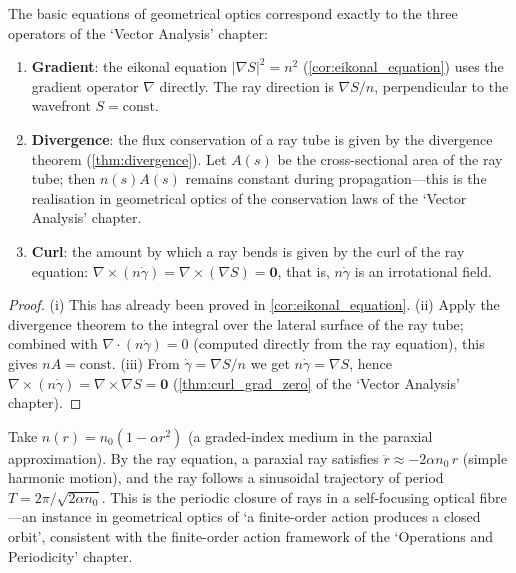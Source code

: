 \begin{property}\label{prop:geometric_optics_interface}
The basic equations of geometrical optics correspond exactly to the three operators of the `Vector Analysis' chapter:
\begin{enumerate}[label=(\roman*)]
    \item \textbf{Gradient}: the eikonal equation $|\nabla S|^2 = n^2$ (\cref{cor:eikonal_equation}) uses the gradient operator $\nabla$ directly. The ray direction is $\nabla S/n$, perpendicular to the wavefront $S=\text{const}$.
    \item \textbf{Divergence}: the flux conservation of a ray tube is given by the divergence theorem (\cref{thm:divergence}). Let $A(s)$ be the cross-sectional area of the ray tube; then $n(s)A(s)$ remains constant during propagation---this is the realisation in geometrical optics of the conservation laws of the `Vector Analysis' chapter.
    \item \textbf{Curl}: the amount by which a ray bends is given by the curl of the ray equation: $\nabla\times(n\dot\gamma) = \nabla\times(\nabla S) = \mathbf{0}$, that is, $n\dot\gamma$ is an irrotational field.
\end{enumerate}
\end{property}

\begin{proof}
(i) This has already been proved in \cref{cor:eikonal_equation}. (ii) Apply the divergence theorem to the integral over the lateral surface of the ray tube; combined with $\nabla\cdot(n\dot\gamma) = 0$ (computed directly from the ray equation), this gives $nA = \text{const}$. (iii) From $\dot\gamma = \nabla S/n$ we get $n\dot\gamma = \nabla S$, hence $\nabla\times(n\dot\gamma) = \nabla\times\nabla S = \mathbf{0}$ (\cref{thm:curl_grad_zero} of the `Vector Analysis' chapter).
\end{proof}

\begin{example}\label{ex:graded_index_ray}
Take $n(r) = n_0(1 - \alpha r^2)$ (a graded-index medium in the paraxial approximation). By the ray equation, a paraxial ray satisfies $\ddot{r} \approx -2\alpha n_0\,r$ (simple harmonic motion), and the ray follows a sinusoidal trajectory of period $T = 2\pi/\sqrt{2\alpha n_0}$. This is the periodic closure of rays in a self-focusing optical fibre---an instance in geometrical optics of `a finite-order action produces a closed orbit', consistent with the finite-order action framework of the `Operations and Periodicity' chapter.
\end{example}

